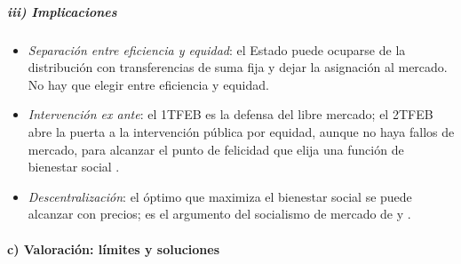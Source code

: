 \documentclass[11pt]{article}
\begin{document}
\subparagraph{iii) Implicaciones}

\begin{itemize}
\item \emph{Separación entre eficiencia y equidad}: el Estado puede ocuparse de la distribución con transferencias de suma fija y dejar la asignación al mercado. No hay que elegir entre eficiencia y equidad.
\item \emph{Intervención \emph{ex ante}}: el 1TFEB es la defensa del libre mercado; el 2TFEB abre la puerta a la intervención pública por equidad, aunque no haya fallos de mercado, para alcanzar el punto de felicidad que elija una función de bienestar social .
\item \emph{Descentralización}: el óptimo que maximiza el bienestar social se puede alcanzar con precios; es el argumento del socialismo de mercado de \textcite{Lange1936Socialism} y \textcite{Lerner1944Economics}.
\end{itemize}

\paragraph{c) Valoración: límites y soluciones}
\end{document}
